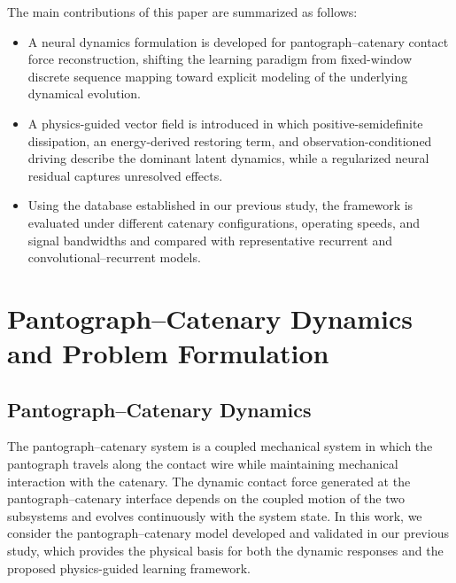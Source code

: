 \documentclass[journal,twoside]{IEEEtran}
\begin{document}
The main contributions of this paper are summarized as follows:
\begin{itemize}
    \item A neural dynamics formulation is developed for pantograph--catenary contact force reconstruction, shifting the learning paradigm from fixed-window discrete sequence mapping toward explicit modeling of the underlying dynamical evolution.
    
    \item A physics-guided vector field is introduced in which positive-semidefinite dissipation, an energy-derived restoring term, and observation-conditioned driving describe the dominant latent dynamics, while a regularized neural residual captures unresolved effects.
    
    \item Using the database established in our previous study, the framework is evaluated under different catenary configurations, operating speeds, and signal bandwidths and compared with representative recurrent and convolutional--recurrent models.
\end{itemize}



\section{Pantograph--Catenary Dynamics and Problem Formulation}
\label{sec:system}

\subsection{Pantograph--Catenary Dynamics}

The pantograph--catenary system is a coupled mechanical system in which the
pantograph travels along the contact wire while maintaining mechanical
interaction with the catenary. The dynamic contact force generated at the
pantograph--catenary interface depends on the coupled motion of the two
subsystems and evolves continuously with the system state. In this work, we
consider the pantograph--catenary model developed and validated in our previous
study, which provides the physical basis for both the dynamic responses and
the proposed physics-guided learning framework.
\end{document}
